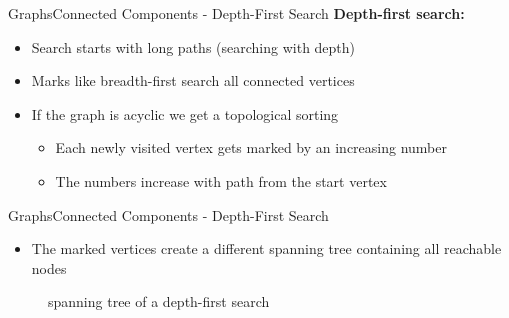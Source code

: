 \begin{frame}{Graphs}{Connected Components - Depth-First Search}
  \textbf{Depth-first search:}
  \begin{itemize}
    \item<2->
      Search starts with {\color{Mittel-Blau}long paths} (searching with depth)
    \item<3->
      Marks like {\color{Mittel-Blau}breadth-first search} all connected
      vertices
    \item<4->
      If the graph is acyclic we get a {\color{Mittel-Blau}topological sorting}
      \begin{itemize}
        \item<5->
          Each newly visited vertex gets marked by an increasing number
        \item<6->
          The numbers increase with path from the start vertex
      \end{itemize}
  \end{itemize}
\end{frame}


\begin{frame}{Graphs}{Connected Components - Depth-First Search}
  \begin{itemize}
    \item<2->
      The marked vertices create a different spanning tree containing all
      reachable nodes
  \end{itemize}
  \begin{figure}
    \begin{adjustbox}{width=0.95\linewidth}
      
    \end{adjustbox}
    \caption{spanning tree of a depth-first search}
    \label{fig:graph:depth_first_search_spanning_tree}
  \end{figure}
\end{frame}


